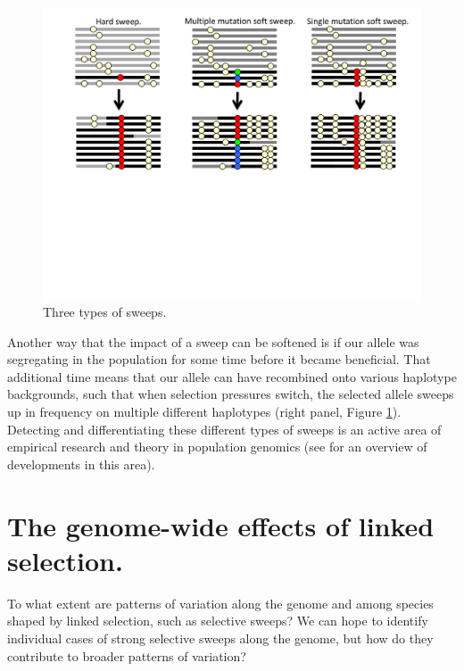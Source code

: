 \begin{figure}
\begin{center}
\includegraphics[width=\textwidth]{figures/Hitchhiking/Soft_sweeps.pdf}
\end{center}
\caption{Three types of sweeps. } \label{fig:soft_sweep_haps}
\end{figure}

Another way that the impact of a sweep can be softened is if our
allele was segregating in the population for some time before it
became beneficial. That additional time means that our allele can have
recombined onto various haplotype backgrounds, such that when
selection pressures switch, the selected allele sweeps up in frequency on 
multiple different haplotypes (right panel, Figure \ref{fig:soft_sweep_haps}). 
Detecting and differentiating these different types of sweeps is an active area of
empirical research and theory in population genomics (see \citet{hermisson2017soft} for an overview of
developments in this area).


\section{The genome-wide effects of linked selection.}
To what extent are patterns of variation along the genome and
  among species shaped by linked selection, such as selective sweeps? 
We can hope to identify individual cases of strong selective sweeps
along the genome, but how do they contribute to broader patterns of
variation?

